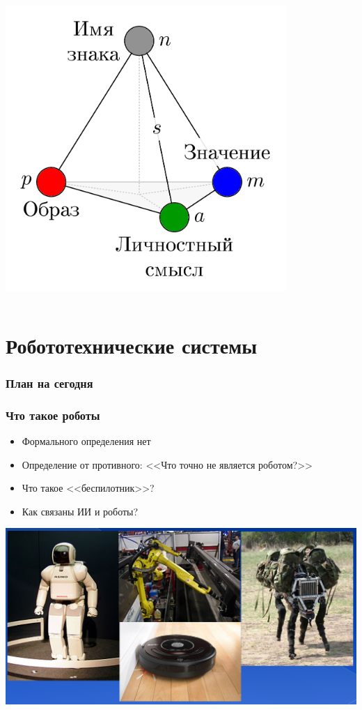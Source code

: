 \documentclass[12pt]{beamer}
\begin{document}
\begin{frame}
\begin{columns}
\begin{column}{0.3\textwidth}
			\includegraphics[width=0.8\textwidth]{sign_colored.png}
		\end{column}
	
	\end{columns}

\end{frame}



\section{Робототехнические системы}

\begin{frame}
\frametitle{План на сегодня}
\tableofcontents[currentsection] 
\end{frame}

\begin{frame}
\frametitle{Что такое роботы}
\begin{itemize}
	\item Формального определения нет
	\item Определение от противного: <<Что точно не является роботом?>>
	\item Что такое <<беспилотник>>?
	\item Как связаны ИИ и роботы?
\end{itemize}
\centering
\includegraphics[width=0.75\linewidth]{robots.png}
\end{frame}
\end{document}
